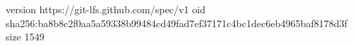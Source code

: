 version https://git-lfs.github.com/spec/v1
oid sha256:ba8b8c2f0aa5a59338b99484cd49fad7ef37171c4bc1dec6eb4965baf8178d3f
size 1549

